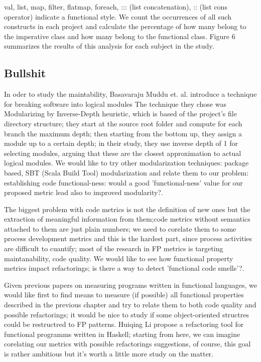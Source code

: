 \documentclass{article}
\begin{document}
val, list, map, filter, flatmap, foreach, ::: (list concatenation), :: (list cons operator) indicate a functional style. We count the occurrences of all such constructs in each project and calculate the percentage of how many belong to the imperative class and how many belong to the functional class. Figure 6 summarizes the results of this analysis for each subject in the study. \cite{Pankratius_combiningfunctional}

\newpage
\subsection{ Bullshit}

In oder to study the maintability, Basavaraju Muddu et. al. introduce a technique for breaking software into logical modules \cite{DBLP:conf/icse/MudduABP13} The technique they chose was Modularizing by  Inverse-Depth heuristic, which is based of the project's file directory structure; they start at the source root folder and compute for each branch the maximum depth; then starting from the bottom up, they assign a module up to a certain depth; in their study, they use inverse depth of 1 for selecting modules, arguing that these are the closest approximation to actual logical modules. We would like to try other modularization techniques: package based, SBT (Scala Build Tool)  modularization and relate them to our problem: establishing code functional-ness: would a good 'functional-ness' value for our proposed metric lead also to improved modularity?.\par

The biggest problem with code metrics is not the definition of new ones but the extraction of  meaningful information from them;code metrics without semantics attached to them are just plain numbers; we need to corelate them to some process development metrics and this is the hardest part, since process activities are difficult to cuantify; most of the research in FP metrics is targeting maintanability, code quality. We would like to see how functional property metrics impact refactorings; is there a way to detect 'functional code smells'?.  \par

Given previous papers on measuring programs written in functional languages, we would like first to find means to measure (if possible) all functional properties described in the previous chapter and try to relate them to both code quality and possible refactorings; it would be nice to study if some object-oriented structres could be restructred to FP patterns. Huiqing Li propose a refactoring tool for functional programms written in Haskell\cite{Li:2003:TSR:871895.871899}; starting from here, we can imagine corelating our metrics with possible refactorings suggestions, of course, this goal is rather ambitious but it's worth a little more study on the matter.
\end{document}
